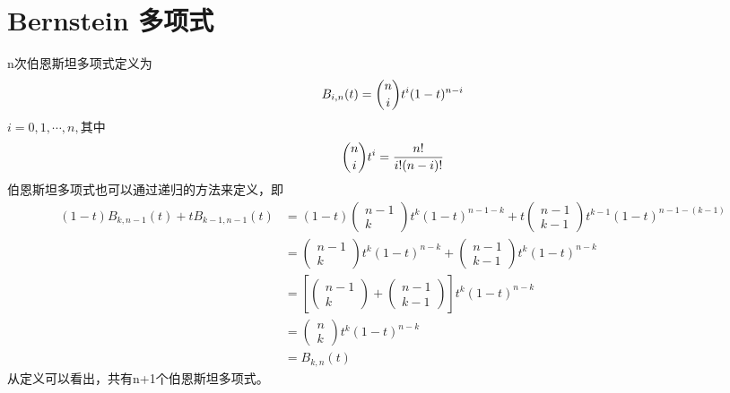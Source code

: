 \section{Bernstein 多项式}
n次伯恩斯坦多项式定义为
\begin{equation}
	B_{i, n}(t) = \dbinom{n}{i}t^{i}(1-t)^{n-i}
\end{equation}
$i=0,1,\cdots,n,$其中
\begin{equation}
\dbinom{n}{i}t^{i}=\frac{n !}{i !(n-i) !}
\end{equation}
伯恩斯坦多项式也可以通过递归的方法来定义，即
\begin{equation}
	\begin{aligned}
		(1-t) B_{k, n-1}(t)+t B_{k-1, n-1}(t) &=(1-t)\left(\begin{array}{c}
			n-1 \\
			k
		\end{array}\right) t^{k}(1-t)^{n-1-k}+t\left(\begin{array}{c}
			n-1 \\
			k-1
		\end{array}\right) t^{k-1}(1-t)^{n-1-(k-1)} \\
		&=\left(\begin{array}{c}
			n-1 \\
			k
		\end{array}\right) t^{k}(1-t)^{n-k}+\left(\begin{array}{c}
			n-1 \\
			k-1
		\end{array}\right) t^{k}(1-t)^{n-k} \\
		&=\left[\left(\begin{array}{c}
			n-1 \\
			k
		\end{array}\right)+\left(\begin{array}{c}
			n-1 \\
			k-1
		\end{array}\right)\right] t^{k}(1-t)^{n-k} \\
		&=\left(\begin{array}{c}
			n \\
			k
		\end{array}\right) t^{k}(1-t)^{n-k} \\
		&=B_{k, n}(t)
	\end{aligned}
\end{equation}
从定义可以看出，共有n+1个伯恩斯坦多项式。